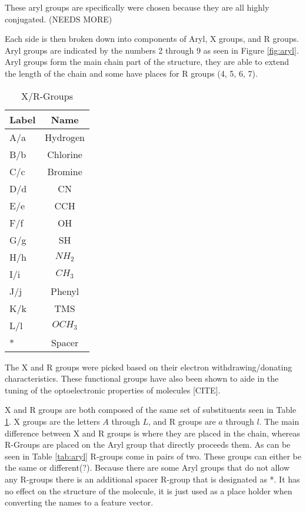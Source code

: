 \documentclass[10pt]{article}
\begin{document}
These aryl groups are specifically were chosen because they are all highly conjugated. (NEEDS MORE)

Each side is then broken down into components of Aryl, X groups, and R groups. Aryl groups are indicated by the numbers 2 through 9 as seen in Figure \ref{fig:aryl}. Aryl groups form the main chain part of the structure, they are able to extend the length of the chain and some have places for R groups (4, 5, 6, 7).

\begin{table}[H]
  \centering
  \caption{X/R-Groups}
  \begin{tabular}{lc}
    Label   & Name      \\
    \hline
    A/a     & Hydrogen  \\
    B/b     & Chlorine  \\
    C/c     & Bromine   \\
    D/d     & CN        \\
    E/e     & CCH       \\
    F/f     & OH        \\
    G/g     & SH        \\
    H/h     & $NH_2$    \\
    I/i     & $CH_3$    \\
    J/j     & Phenyl    \\
    K/k     & TMS       \\
    L/l     & $OCH_3$   \\
    *       & Spacer    \\
    \hline
  \end{tabular}
  \label{tab:xrgroups}
\end{table}

The X and R groups were picked based on their electron withdrawing/donating characteristics. These functional groups have also been shown to aide in the tuning of the optoelectronic properties of molecules [CITE].


X and R groups are both composed of the same set of substituents seen in Table \ref{tab:xrgroups}. X groups are the letters $A$ through $L$, and R groups are $a$ through $l$. The main difference between X and R groups is where they are placed in the chain, whereas R-Groups are placed on the Aryl group that directly proceeds them. As can be seen in Table \ref{tab:aryl} R-groups come in pairs of two. These groups can either be the same or different(?). Because there are some Aryl groups that do not allow any R-groups there is an additional spacer R-group that is designated as *. It has no effect on the structure of the molecule, it is just used as a place holder when converting the names to a feature vector.
\end{document}
